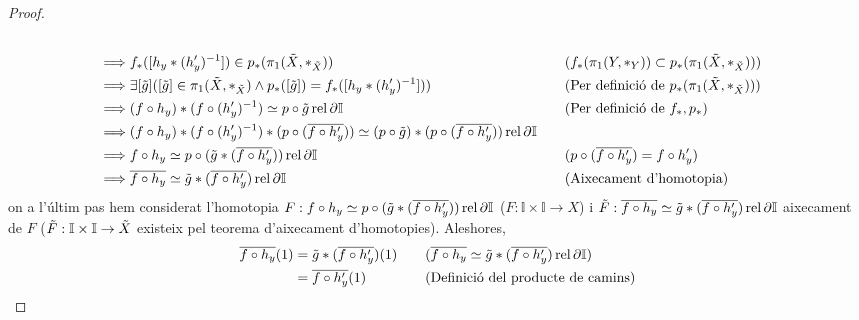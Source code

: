 \documentclass[compress,10pt]{article}
\theoremstyle{definition}
\DeclareMathOperator{\rel}{rel}
\begin{document}
\begin{proof}
\begin{align*}
        &&\\
        \implies
        &f_{*}([h_{y}*(h_{y}')^{-1}])\in p_{*}(\pi_{1}(\Tilde{X},*_{\Tilde{X}}))
        &\quad&\textrm{($f_{*}(\pi_{1}(Y,*_{Y}))\subset p_{*}(\pi_{1}(\Tilde{X},*_{\Tilde{X}}))$)}\\
        \implies
        &\exists[\Tilde{g}]([\Tilde{g}]\in\pi_{1}(\Tilde{X},*_{\Tilde{X}})\land p_{*}([\Tilde{g}])=f_{*}([h_{y}*(h_{y}')^{-1}]))
        &\quad&\textrm{(Per definició de $p_{*}(\pi_{1}(\Tilde{X},*_{\Tilde{X}}))$)}\\
        \implies
        &(f\circ h_{y})*(f\circ(h_{y}')^{-1})\simeq p\circ\Tilde{g}\rel\partial\mathbb{I}
        &\quad&\textrm{(Per definició de $f_{*},p_{*}$)}\\
        \implies
        &(f\circ h_{y})*(f\circ(h_{y}')^{-1})*(p\circ(\overline{f\circ h_{y}'}))\simeq (p\circ\Tilde{g})*(p\circ(\overline{f\circ h_{y}'}))\rel\partial\mathbb{I}
        &&\\
        \implies
        &f\circ h_{y}\simeq p\circ(\Tilde{g}*(\overline{f\circ h_{y}'}))\rel\partial\mathbb{I}
        &\quad&\textrm{($p\circ(\overline{f\circ h_{y}'})=f\circ h_{y}'$)}\\
        \implies
        &\overline{f\circ h_{y}}\simeq\Tilde{g}*(\overline{f\circ h_{y}'})\rel\partial\mathbb{I}
        &\quad&\textrm{(Aixecament d'homotopia)}
    \end{align*}
    on a l'últim pas hem considerat l'homotopia $F:f\circ h_{y}\simeq p\circ(\Tilde{g}*(\overline{f\circ h_{y}'}))\rel\partial\mathbb{I}$ ($F:\mathbb{I}\times\mathbb{I}\rightarrow X$) i $\Tilde{F}:\overline{f\circ h_{y}}\simeq\Tilde{g}*(\overline{f\circ h_{y}'})\rel\partial\mathbb{I}$ aixecament de $F$ ($\Tilde{F}:\mathbb{I}\times\mathbb{I}\rightarrow\Tilde{X}$ existeix pel teorema d'aixecament d'homotopies). Aleshores,
    \begin{align*}
        \overline{f\circ h_{y}}(1)
        &=\Tilde{g}*(\overline{f\circ h_{y}'})(1)
        &\quad&\textrm{($\overline{f\circ h_{y}}\simeq\Tilde{g}*(\overline{f\circ h_{y}'})\rel\partial\mathbb{I}$)}\\
        &=\overline{f\circ h_{y}'}(1)
        &\quad&\textrm{(Definició del producte de camins)}
    \end{align*}

\end{proof}
\end{document}
